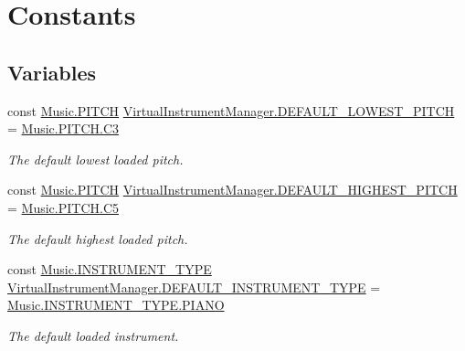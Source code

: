 \hypertarget{group___v_i_m_const}{}\section{Constants}
\label{group___v_i_m_const}
\subsection*{Variables}
\begin{DoxyCompactItemize}
\item 
const \hyperlink{group___music_enums_ga508f69b199ea518f935486c990edac1d}{Music.\+P\+I\+T\+CH} \hyperlink{group___v_i_m_const_ga0ae09555ae6bc8a04110599510a0d77d}{Virtual\+Instrument\+Manager.\+D\+E\+F\+A\+U\+L\+T\+\_\+\+L\+O\+W\+E\+S\+T\+\_\+\+P\+I\+T\+CH} = \hyperlink{group___music_enums_gga508f69b199ea518f935486c990edac1da3abe124ecc82bf2c2e22e6058f38c50c}{Music.\+P\+I\+T\+C\+H.\+C3}
\begin{DoxyCompactList}\small\item\em The default lowest loaded pitch. \end{DoxyCompactList}\item 
const \hyperlink{group___music_enums_ga508f69b199ea518f935486c990edac1d}{Music.\+P\+I\+T\+CH} \hyperlink{group___v_i_m_const_gadb93993bf989a9ac6e95be9e1561a5bb}{Virtual\+Instrument\+Manager.\+D\+E\+F\+A\+U\+L\+T\+\_\+\+H\+I\+G\+H\+E\+S\+T\+\_\+\+P\+I\+T\+CH} = \hyperlink{group___music_enums_gga508f69b199ea518f935486c990edac1dafea813d4ddba3c46cf8b8e664b92cdaa}{Music.\+P\+I\+T\+C\+H.\+C5}
\begin{DoxyCompactList}\small\item\em The default highest loaded pitch. \end{DoxyCompactList}\item 
const \hyperlink{group___music_enums_gabfce60192305965558a36e368ebd67c3}{Music.\+I\+N\+S\+T\+R\+U\+M\+E\+N\+T\+\_\+\+T\+Y\+PE} \hyperlink{group___v_i_m_const_gad74e35b317d6cc0bb57a78117fa430e6}{Virtual\+Instrument\+Manager.\+D\+E\+F\+A\+U\+L\+T\+\_\+\+I\+N\+S\+T\+R\+U\+M\+E\+N\+T\+\_\+\+T\+Y\+PE} = \hyperlink{group___music_enums_ggabfce60192305965558a36e368ebd67c3aef6dcf375679288e8fe520ec07f29130}{Music.\+I\+N\+S\+T\+R\+U\+M\+E\+N\+T\+\_\+\+T\+Y\+P\+E.\+P\+I\+A\+NO}
\begin{DoxyCompactList}\small\item\em The default loaded instrument. \end{DoxyCompactList}\end{DoxyCompactItemize}


